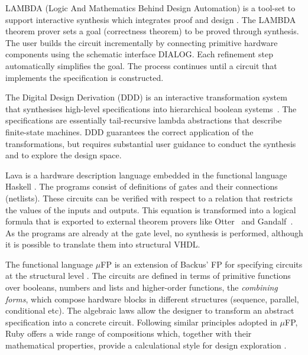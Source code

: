 
LAMBDA (Logic And Mathematics Behind Design Automation)
is a tool-set to support interactive synthesis which
integrates proof and design \cite{Fou89,Fou96}.
The LAMBDA theorem prover sets a goal (correctness theorem)
to be proved through synthesis. 
The user builds the circuit incrementally by 
connecting primitive hardware components using
the schematic interface DIALOG.
Each refinement step automatically simplifies the goal.
The process continues until a circuit that implements the
specification is constructed.

The Digital Design Derivation (DDD) is 
an interactive transformation system that synthesises
high-level specifications into hierarchical
boolean systems~\cite{Johnson90}.
The specifications are essentially tail-recursive lambda 
abstractions that describe finite-state machines.
DDD guarantees the correct application of
the transformations, but requires substantial user
guidance to conduct the synthesis and to
explore the design space.


Lava \cite{BCSS99} is a hardware description language embedded
in the functional language Haskell \cite{Jon03}.
The programs consist of definitions
of gates and their connections (netlists).
These circuits can be verified with respect to a relation that
restricts the values of the inputs and outputs.
This equation is transformed into a logical formula that
is exported to external theorem provers like 
Otter~\cite{MW97} and Gandalf~\cite{Tam97}.
As the programs are already at the gate level,
no synthesis is performed, although it is possible
to translate them into structural VHDL.

The functional language $\mu$FP is an extension 
of Backus' FP for specifying circuits at the 
structural level \cite{Bac78,She84}. 
The circuits are defined in terms of primitive
functions over booleans, numbers and lists and
higher-order functions, the {\em combining forms\/},
which compose hardware blocks in different
structures (sequence, parallel, conditional etc).
The algebraic laws allow the designer to
transform an abstract specification into
a concrete circuit. Following similar principles
adopted in $\mu$FP, Ruby offers a wide
range of compositions which, together with
their mathematical properties, provide
a calculational style for design exploration \cite{JS90}.

